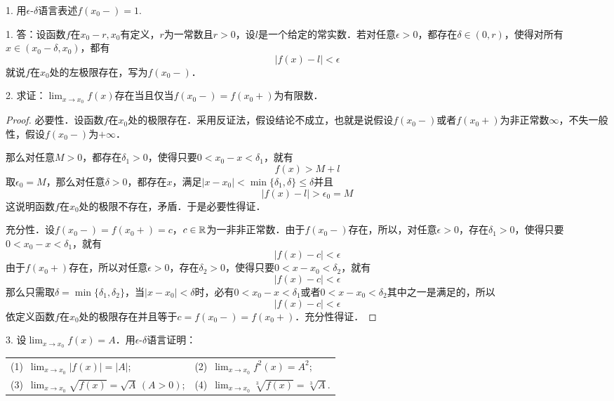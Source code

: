 \exercise

1. 用$\epsilon$-$\delta$语言表述$f(x_0 -) = 1$.

1. 答：设函数$f$在$x_0 - r, x_0$有定义，$r$为一常数且$r > 0$，设$l$是一个给定的常实数．若对任意$\epsilon > 0$，都存在$\delta \in (0, r)$，使得对所有$x \in (x_0-\delta, x_0)$，都有
\begin{equation}
    |f(x) - l| < \epsilon
\end{equation}
就说$f$在$x_0$处的左极限存在，写为$f(x_0 -)$．

2. 求证：$\displaystyle\lim_{x \to x_0} f(x)$存在当且仅当$f(x_0 -) = f(x_0 +)$为有限数．

\begin{proof}
必要性．设函数$f$在$x_0$处的极限存在．采用反证法，假设结论不成立，也就是说假设$f(x_0 -)$或者$f(x_0 +)$为非正常数$\infty$，不失一般性，假设$f(x_0 -)$为$+\infty$．

那么对任意$M > 0$，都存在$\delta_1 > 0$，使得只要$0 < x_0 - x < \delta_1$，就有
\begin{equation}
    f(x) > M + l
\end{equation}
取$\epsilon_0 = M$，那么对任意$\delta > 0$，都存在$x$，满足$|x - x_0| < \min \{ \delta_1, \delta \} \leq \delta $并且
\begin{equation}
    |f(x) - l| > \epsilon_0 = M
\end{equation}
这说明函数$f$在$x_0$处的极限不存在，矛盾．于是必要性得证．

充分性．设$f(x_0 -) = f(x_0 +) = c$，$c \in \mathbb{R}$为一非非正常数．由于$f(x_0 -)$存在，所以，对任意$\epsilon > 0$，存在$\delta_1 > 0$，使得只要$0 < x_0 - x < \delta_1$，就有
\begin{equation}
    |f(x) - c| < \epsilon
\end{equation}
由于$f(x_0 +)$存在，所以对任意$\epsilon > 0$，存在$\delta_2 > 0$，使得只要$0 < x - x_0 < \delta_2$，就有
\begin{equation}
    |f(x) - c| < \epsilon
\end{equation}
那么只需取$\delta = \min \{ \delta_1, \delta_2 \}$，当$|x - x_0| < \delta$时，必有$0 < x_0 - x < \delta_1$或者$0 < x - x_0 < \delta_2$其中之一是满足的，所以
\begin{equation}
    |f(x) - c| < \epsilon
\end{equation}
依定义函数$f$在$x_0$处的极限存在并且等于$c = f(x_0 -) = f(x_0 +)$．充分性得证．
\end{proof}

3. 设$\displaystyle\lim_{x \to x_0} f(x) = A$．用$\epsilon$-$\delta$语言证明：
\begin{table}[H]
    \centering
    \begin{tabularx}{0.8\textwidth} {  >{\raggedright\arraybackslash}X >{\raggedright\arraybackslash}X  }
       (1)~$\displaystyle\lim_{x \to x_0} |f(x)| = |A|$; & (2)~$\displaystyle\lim_{x \to x_0} f^2(x)=A^2$; \\ [1em]
       (3)~$\displaystyle\lim_{x \to x_0} \sqrt{f(x)} = \sqrt{A} \, (A > 0)$; & (4)~$\displaystyle\lim_{x \to x_0} \sqrt[3]{f(x)} = \sqrt[3]{A}$.
      \end{tabularx}
\end{table}

